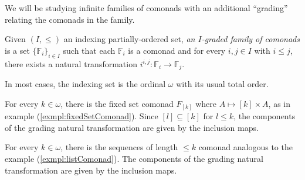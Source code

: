 We will be studying infinite families of comonads with an additional ``grading'' relating the comonads in the family.
\begin{defn}
Given $(I,\leq)$ an indexing partially-ordered set, \textit{an $I$-graded family of comonads} is a set $\{\mathbb{F}_{i}\}_{i \in I}$ such that each $\mathbb{F}_{i}$ is a comonad and for every $i, j \in I$ with $i \leq j$, there exists a natural transformation $i^{i,j}:\mathbb{F}_{i} \longrightarrow \mathbb{F}_{j}$.  
\end{defn}
In most cases, the indexing set is the ordinal $\omega$ with its usual total order.  
\begin{exmpl}
For every $k \in \omega$, there is the fixed set comonad $F_{[k]}$ where $A \mapsto [k] \times A$, as in example (\ref{exmpl:fixedSetComonad}). Since $[l] \subseteq [k]$ for $l \leq k$, the components of the grading natural transformation are given by the inclusion maps. 
\end{exmpl}
\begin{exmpl}
For every $k \in \omega$, there is the sequences of length $\leq k$ comonad analogous to the example (\ref{exmpl:listComonad}). The components of the grading natural transformation are given by the inclusion maps. 
\end{exmpl}
